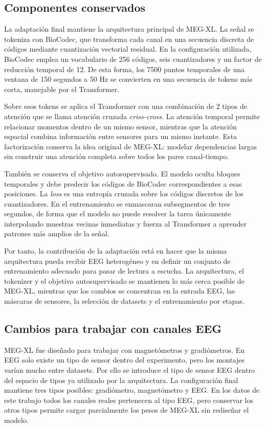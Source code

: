 \subsection{Componentes conservados}

La adaptación final mantiene la arquitectura principal de MEG-XL. La señal se tokeniza con BioCodec, que transforma cada canal en una secuencia discreta de códigos mediante cuantización vectorial residual. En la configuración utilizada, BioCodec emplea un vocabulario de 256 códigos, seis cuantizadores y un factor de reducción temporal de 12. De esta forma, los 7500 puntos temporales de una ventana de 150 segundos a 50 Hz se convierten en una secuencia de tokens más corta, manejable por el Transformer.

Sobre esos tokens se aplica el Transformer con una combinación de 2 tipos de atención que se llama atención cruzada \textit{criss-cross}. La atención temporal permite relacionar momentos dentro de un mismo sensor, mientras que la atención espacial combina información entre sensores para un mismo instante. Esta factorización conserva la idea original de MEG-XL: modelar dependencias largas sin construir una atención completa sobre todos los pares canal-tiempo.

También se conserva el objetivo autosupervisado. El modelo oculta bloques temporales y debe predecir los códigos de BioCodec correspondientes a esas posiciones. La \textit{loss} es una entropía cruzada sobre los códigos discretos de los cuantizadores. En el entrenamiento se enmascaran subsegmentos de tres segundos, de forma que el modelo no puede resolver la tarea únicamente interpolando muestras vecinas inmediatas y fuerza al Transformer a aprender patrones más amplios de la señal.

Por tanto, la contribución de la adaptación está en hacer que la misma arquitectura pueda recibir EEG heterogéneo y en definir un conjunto de entrenamiento adecuado para pasar de lectura a escucha. La arquitectura, el tokenizer y el objetivo autosupervisado se mantienen lo más cerca posible de MEG-XL, mientras que los cambios se concentran en la entrada EEG, las máscaras de sensores, la selección de datasets y el entrenamiento por etapas.

\subsection{Cambios para trabajar con canales EEG}

MEG-XL fue diseñado para trabajar con magnetómetros y gradiómetros. En EEG solo existe un tipo de sensor dentro del experimento, pero los montajes varían mucho entre datasets. Por ello se introduce el tipo de sensor EEG dentro del espacio de tipos ya utilizado por la arquitectura. La configuración final mantiene tres tipos posibles: gradiómetro, magnetómetro y EEG. En los datos de este trabajo todos los canales reales pertenecen al tipo EEG, pero conservar los otros tipos permite cargar parcialmente los pesos de MEG-XL sin rediseñar el modelo.

